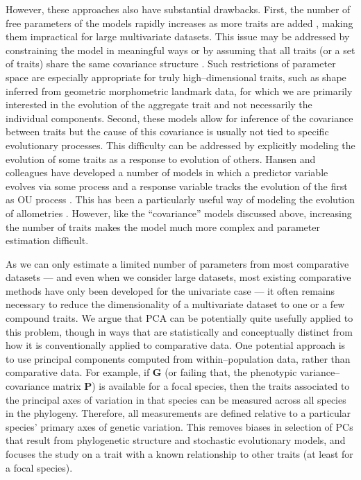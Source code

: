 \documentclass[a4paper,11pt]{article}
\begin{document}
However, these approaches also have substantial drawbacks. First, the number of free parameters of the models rapidly increases as more traits are added \citep{RevellHarmon2008}, making them impractical for large multivariate datasets. This issue may be addressed by constraining the model in meaningful ways \citep{ButlerKing2004} or by assuming that all traits (or a set of traits) share the same covariance structure \citep{Klingenberg2013, Adams2014}. Such restrictions of parameter space are especially appropriate for truly high--dimensional traits, such as shape inferred from geometric morphometric landmark data, for which we are primarily interested in the evolution of the aggregate trait and not necessarily the individual components. Second, these models allow for inference of the covariance between traits but the cause of this covariance is usually not tied to specific evolutionary processes. This difficulty can be addressed by explicitly modeling the evolution of some traits as a response to evolution of others. Hansen and colleagues have developed a number of models in which a predictor variable evolves via some process and a response variable tracks the evolution of the first as OU process \citep{Hansen2008, Hansen2012SysBio, Bartoszek2012}. This has been a particularly useful way of modeling the evolution of allometries \citep{Hansen2012SysBio, Voje2013}. However, like the ``covariance''  models discussed above, increasing the number of traits makes the model much more complex and parameter estimation difficult.

As we can only estimate a limited number of parameters from most comparative datasets --- and even when we consider large datasets, most existing comparative methods have only been developed for the univariate case --- it often remains necessary to reduce the dimensionality of a multivariate dataset to one or a few compound traits. We argue that PCA can be potentially quite usefully applied to this problem, though in ways that are statistically and conceptually distinct from how it is conventionally applied to comparative data. One potential approach is to use principal components computed from within--population data, rather than comparative data. For example, if $\mathbf{G}$ (or failing that, the phenotypic variance--covariance matrix $\mathbf{P}$) is available for a focal species, then the traits associated to the principal axes of variation in that species can be measured across all species in the phylogeny. Therefore, all measurements are defined relative to a particular species' primary axes of genetic variation. This removes biases in selection of PCs that result from phylogenetic structure and stochastic evolutionary models, and focuses the study on a trait with a known relationship to other traits (at least for a focal species). 
\end{document}
